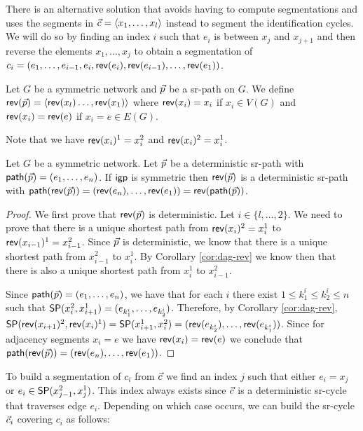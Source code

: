 There is an alternative solution that avoids having to compute segmentations and uses the segments
in $\sr{c} = \langle x_1, \ldots, x_l \rangle$ instead to segment the identification cycles. We will do so by finding an index $i$ such that
$e_i$ is between $x_j$ and $x_{j + 1}$ and then reverse the elements $x_1, \ldots, x_j$
to obtain a segmentation of $c_i = (e_1, \ldots, e_{i - 1}, e_i, \rev(e_i), \rev(e_{i - 1}), \ldots, \rev(e_1))$.

\begin{definition}
Let $G$ be a symmetric network and $\sr{p}$ be a sr-path on $G$. We define $\rev(\sr{p}) = \langle \rev(x_l) \ldots, \rev(x_1) \rangle$ where
$\rev(x_i) = x_i$ if $x_i \in V(G)$ and $\rev(x_i) = \rev(e)$ if $x_i = e \in E(G)$.

Note that we have $\rev(x_i)^1 = x^2_i$ and $\rev(x_i)^2 = x^1_i$.
\end{definition}

\begin{lemma}
\label{lemma:rev-sr}
Let $G$ be a symmetric network. Let $\sr{p}$ be a deterministic sr-path
with $\seq(\sr{p}) = (e_1, \ldots, e_n)$. If $\igp$ is symmetric then $\rev(\sr{p})$ is a deterministic sr-path with 
$\seq(\rev(\sr{p})) = (\rev(e_n), \ldots, \rev(e_1)) = \rev(\seq(\sr{p}))$.
\end{lemma}

\begin{proof}
We first prove that $\rev(\sr{p})$ is deterministic. Let $i \in \{l, \ldots, 2\}$. We need to prove that there 
is a unique shortest path from $\rev(x_i)^2 = x^1_i$ to $\rev(x_{i - 1})^1 = x^2_{i - 1}$. Since $\sr{p}$
is deterministic, we know that there is a unique shortest path from $x^2_{i - 1}$ to $x^1_i$. By Corollary 
\ref{cor:dag-rev} we know then that there is also a unique shortest path from $x^1_i$ to $x^2_{i - 1}$.

Since $\seq(\sr{p}) = (e_1, \ldots, e_n)$, we have that for each $i$ there exist $1 \leq k^i_1 \leq k^i_2 \leq n$ such that
$\sp(x^2_i, x^1_{i + 1}) = (e_{k^i_1}, \ldots, e_{k^i_2})$. Therefore, by Corollary \ref{cor:dag-rev}, 
$\sp(\rev(x_{i + 1})^2, \rev(x_i)^1) = \sp(x^1_{i + 1}, x^2_i) = (\rev(e_{k^i_2}), \ldots, \rev(e_{k^i_1}))$.
Since for adjacency segments $x_i = e$ we have $\rev(x_i) = \rev(e)$ we conclude that $\seq(\rev(\sr{p})) = (\rev(e_n), \ldots, \rev(e_1))$.
\end{proof}

To build a segmentation of $c_i$ from $\sr{c}$ we find an index $j$
such that either $e_i = x_j$ or $e_i \in \sp(x^2_{j - 1}, x^1_j)$. This index always exists since $\sr{c}$
is a deterministic sr-cycle that traverses edge $e_i$. Depending on which case occurs, we can build 
the sr-cycle $\sr{c}_i$ covering $c_i$ as follows: \\

